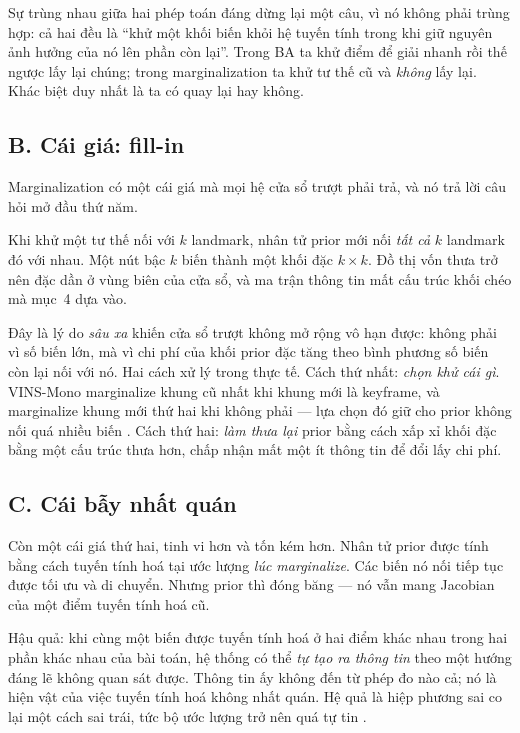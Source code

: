 \documentclass[../../vslam.tex]{subfiles}
\begin{document}
Sự trùng nhau giữa hai phép toán đáng dừng lại một câu, vì nó không phải trùng hợp: cả hai đều là ``khử một khối biến khỏi hệ tuyến tính trong khi giữ nguyên ảnh hưởng của nó lên phần còn lại''. Trong BA ta khử điểm để giải nhanh rồi thế ngược lấy lại chúng; trong marginalization ta khử tư thế cũ và \emph{không} lấy lại. Khác biệt duy nhất là ta có quay lại hay không.

\subsection{B. Cái giá: fill-in}

Marginalization có một cái giá mà mọi hệ cửa sổ trượt phải trả, và nó trả lời câu hỏi mở đầu thứ năm.

Khi khử một tư thế nối với \(k\) landmark, nhân tử prior mới nối \emph{tất cả} \(k\) landmark đó với nhau. Một nút bậc \(k\) biến thành một khối đặc \(k\times k\). Đồ thị vốn thưa trở nên đặc dần ở vùng biên của cửa sổ, và ma trận thông tin mất cấu trúc khối chéo mà mục~4 dựa vào.

Đây là lý do \emph{sâu xa} khiến cửa sổ trượt không mở rộng vô hạn được: không phải vì số biến lớn, mà vì chi phí của khối prior đặc tăng theo bình phương số biến còn lại nối với nó. Hai cách xử lý trong thực tế. Cách thứ nhất: \emph{chọn khử cái gì}. VINS-Mono marginalize khung cũ nhất khi khung mới là keyframe, và marginalize khung mới thứ hai khi không phải --- lựa chọn đó giữ cho prior không nối quá nhiều biến \cite{qin2018vinsmono}. Cách thứ hai: \emph{làm thưa lại} prior bằng cách xấp xỉ khối đặc bằng một cấu trúc thưa hơn, chấp nhận mất một ít thông tin để đổi lấy chi phí.

\subsection{C. Cái bẫy nhất quán}

Còn một cái giá thứ hai, tinh vi hơn và tốn kém hơn. Nhân tử prior được tính bằng cách tuyến tính hoá tại ước lượng \emph{lúc marginalize}. Các biến nó nối tiếp tục được tối ưu và di chuyển. Nhưng prior thì đóng băng --- nó vẫn mang Jacobian của một điểm tuyến tính hoá cũ.

Hậu quả: khi cùng một biến được tuyến tính hoá ở hai điểm khác nhau trong hai phần khác nhau của bài toán, hệ thống có thể \emph{tự tạo ra thông tin} theo một hướng đáng lẽ không quan sát được. Thông tin ấy không đến từ phép đo nào cả; nó là hiện vật của việc tuyến tính hoá không nhất quán. Hệ quả là hiệp phương sai co lại một cách sai trái, tức bộ ước lượng trở nên quá tự tin \cite{huang2008fej}.
\end{document}
